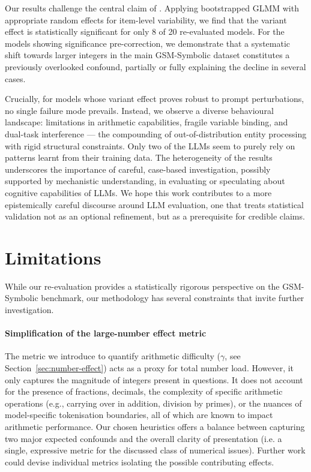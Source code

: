 \documentclass[11pt]{article}
\begin{document}
Our results challenge the central claim of \citet{mirzadeh2025gsm}. Applying bootstrapped GLMM with appropriate random effects for item-level variability, we find that the variant effect is statistically significant for only 8 of 20 re-evaluated models. For the models showing significance pre-correction, we demonstrate that a systematic shift towards larger integers in the main GSM-Symbolic dataset constitutes a previously overlooked confound, partially or fully explaining the decline in several cases.

Crucially, for models whose variant effect proves robust to prompt perturbations, no single failure mode prevails. Instead, we observe a diverse behavioural landscape: limitations in arithmetic capabilities, fragile variable binding, and dual-task interference --- the compounding of out-of-distribution entity processing with rigid structural constraints. Only two of the LLMs seem to purely rely on patterns learnt from their training data. The heterogeneity of the results underscores the importance of careful, case-based investigation, possibly supported by mechanistic understanding, in evaluating or speculating about cognitive capabilities of LLMs.
We hope this work contributes to a more epistemically careful discourse around LLM evaluation, one that treats statistical validation not as an optional refinement, but as a prerequisite for credible claims.


\section*{Limitations}

While our re-evaluation provides a statistically rigorous perspective on the GSM-Symbolic benchmark, our methodology has several constraints that invite further investigation.

\paragraph{Simplification of the large-number effect metric} The metric we introduce to quantify arithmetic difficulty ($\gamma$, see Section~\ref{sec:number-effect}) acts as a proxy for total number load. However, it only captures the magnitude of integers present in questions. It does not account for the presence of fractions, decimals, the complexity of specific arithmetic operations (e.g., carrying over in addition, division by primes), or the nuances of model-specific tokenisation boundaries, all of which are known to impact arithmetic performance. Our chosen heuristics offers a balance between capturing two major expected confounds and the overall clarity of presentation (i.e. a single, expressive metric for the discussed class of numerical issues). Further work could devise individual metrics isolating the possible contributing effects. 
\end{document}
